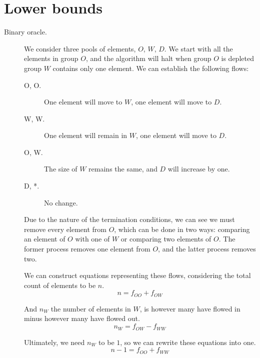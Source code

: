 \documentclass{article}
\begin{document}
\section{Lower bounds}

\begin{description}
    \item[Binary oracle.] We consider three pools of elements, $O$, $W$, $D$.
        We start with all the elements in group $O$, and the algorithm will
        halt when group $O$ is depleted group $W$ contains only one element. We
        can establish the following flows:
        \begin{description}
            \item[O, O.] One element will move to $W$, one element will move to
                $D$.
            \item[W, W.] One element will remain in $W$, one element will move
                to $D$.
            \item[O, W.] The size of $W$ remains the same, and $D$ will
                increase by one.
            \item[D, *.] No change.
        \end{description}

        Due to the nature of the termination conditions, we can see we must
        remove every element from $O$, which can be done in two ways: comparing
        an element of $O$ with one of $W$ or comparing two elements of $O$. The
        former process removes one element from $O$, and the latter process
        removes two.

        We can construct equations representing these flows, considering the
        total count of elements to be $n$.
        \begin{equation*}
            n = f_{OO} + f_{OW}
        \end{equation*}

        And $n_W$ the number of elements in $W$, is however many have flowed in
        minus however many have flowed out.
        \begin{equation*}
            n_W = f_{OW} - f_{WW}
        \end{equation*}

        Ultimately, we need $n_W$ to be $1$, so we can rewrite these equations
        into one.
        \begin{equation*}
            n - 1 = f_{OO} + f_{WW}
        \end{equation*}


\end{description}
\end{document}
